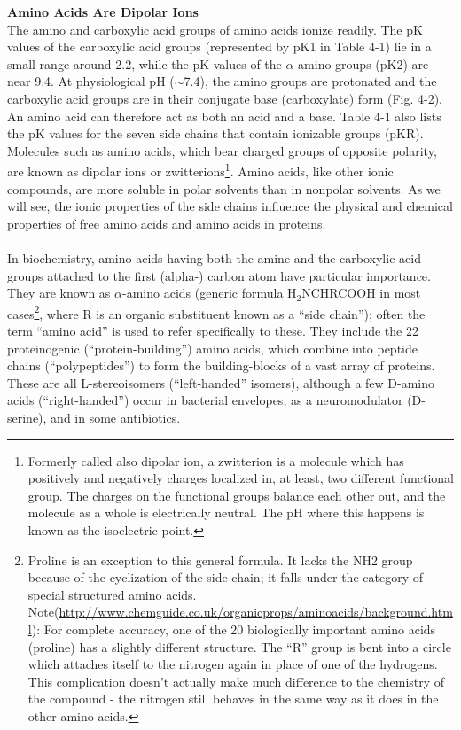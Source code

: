 \textbf{Amino Acids Are Dipolar Ions}\\
The amino and carboxylic acid groups of amino acids ionize readily. The pK values of the carboxylic acid groups (represented by pK1 in Table 4-1) lie in a small range around 2.2, while the pK values of the $\alpha$-amino groups (pK2) are near 9.4. At physiological pH ($\sim$7.4), the amino groups are protonated and the carboxylic acid groups are in their conjugate base (carboxylate) form (Fig. 4-2). An amino acid can therefore act as both an acid and a base. Table 4-1 also lists the pK values for the seven side chains that contain ionizable groups (pKR). Molecules such as amino acids, which bear charged groups of opposite polarity, are known as dipolar ions or zwitterions\footnote{Formerly called also dipolar ion, a zwitterion is a molecule which has positively and negatively charges localized in, at least, two different functional group. The charges on the functional groups balance each other out, and the molecule as a whole is electrically neutral. The pH where this happens is known as the isoelectric point.}. Amino acids, like other ionic compounds, are more soluble in polar solvents than in nonpolar solvents. As we will see, the ionic properties of the side chains influence the physical and chemical properties of free amino acids and amino acids in proteins.
\cite{voet2016fundamentals}\\
\\
In biochemistry, amino acids having both the amine and the carboxylic acid groups attached to the first (alpha-) carbon atom have particular importance. They are known as $\alpha$-amino acids (generic formula H$_2$NCHRCOOH in most cases\footnote{Proline is an exception to this general formula. It lacks the NH2 group because of the cyclization of the side chain; it falls under the category of special structured amino acids. Note(\url{http://www.chemguide.co.uk/organicprops/aminoacids/background.html}):  For complete accuracy, one of the 20 biologically important amino acids (proline) has a slightly different structure. The ``R'' group is bent into a circle which attaches itself to the nitrogen again in place of one of the hydrogens. This complication doesn't actually make much difference to the chemistry of the compound - the nitrogen still behaves in the same way as it does in the other amino acids.},
where R is an organic substituent known as a ``side chain''); often the term ``amino acid'' is used to refer specifically to these. They include the 22 proteinogenic (``protein-building'') amino acids, which combine into peptide chains (``polypeptides'') to form the building-blocks of a vast array of proteins. These are all L-stereoisomers (``left-handed'' isomers), although a few D-amino acids (``right-handed'') occur in bacterial envelopes, as a neuromodulator (D-serine), and in some antibiotics.

